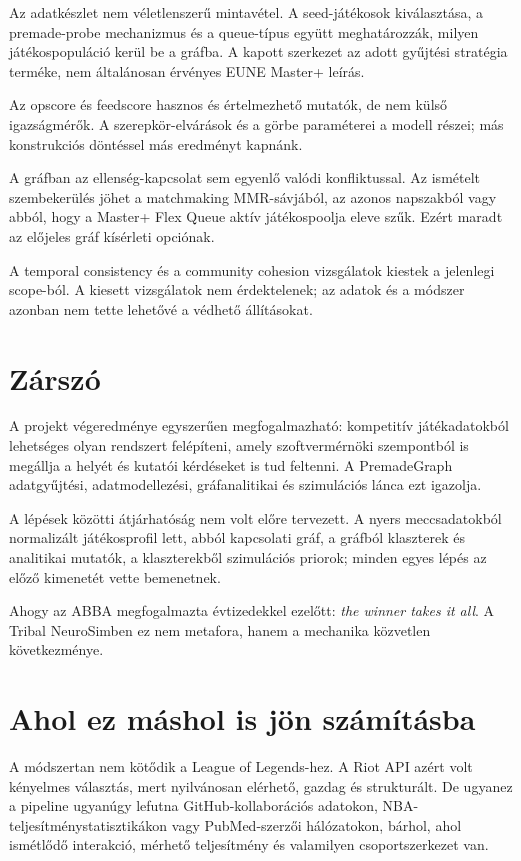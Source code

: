 Az adatkészlet nem véletlenszerű mintavétel. A seed-játékosok kiválasztása, a premade-probe mechanizmus és a queue-típus együtt meghatározzák, milyen játékospopuláció kerül be a gráfba. A kapott szerkezet az adott gyűjtési stratégia terméke, nem általánosan érvényes EUNE Master+ leírás.

Az opscore és feedscore hasznos és értelmezhető mutatók, de nem külső igazságmérők. A szerepkör-elvárások és a görbe paraméterei a modell részei; más konstrukciós döntéssel más eredményt kapnánk.

A gráfban az ellenség-kapcsolat sem egyenlő valódi konfliktussal. Az ismételt szembekerülés jöhet a matchmaking MMR-sávjából, az azonos napszakból vagy abból, hogy a Master+ Flex Queue aktív játékospoolja eleve szűk. Ezért maradt az előjeles gráf kísérleti opciónak.

A temporal consistency és a community cohesion vizsgálatok kiestek a jelenlegi scope-ból. A kiesett vizsgálatok nem érdektelenek; az adatok és a módszer azonban nem tette lehetővé a védhető állításokat.

\section{Zárszó}

A projekt végeredménye egyszerűen megfogalmazható: kompetitív játékadatokból lehetséges olyan rendszert felépíteni, amely szoftvermérnöki szempontból is megállja a helyét és kutatói kérdéseket is tud feltenni. A PremadeGraph adatgyűjtési, adatmodellezési, gráfanalitikai és szimulációs lánca ezt igazolja.

A lépések közötti átjárhatóság nem volt előre tervezett. A nyers meccsadatokból normalizált játékosprofil lett, abból kapcsolati gráf, a gráfból klaszterek és analitikai mutatók, a klaszterekből szimulációs priorok; minden egyes lépés az előző kimenetét vette bemenetnek.

Ahogy az ABBA megfogalmazta évtizedekkel ezelőtt: \textit{the winner takes it all}.
A Tribal NeuroSimben ez nem metafora, hanem a mechanika közvetlen következménye.

\section{Ahol ez máshol is jön számításba}
\label{sec:osszegzes-transfer}

A módszertan nem kötődik a League of Legends-hez. A Riot API azért volt kényelmes választás, mert nyilvánosan elérhető, gazdag és strukturált. De ugyanez a pipeline ugyanúgy lefutna GitHub-kollaborációs adatokon, NBA-teljesítménystatisztikákon vagy PubMed-szerzői hálózatokon, bárhol, ahol ismétlődő interakció, mérhető teljesítmény és valamilyen csoportszerkezet van.

